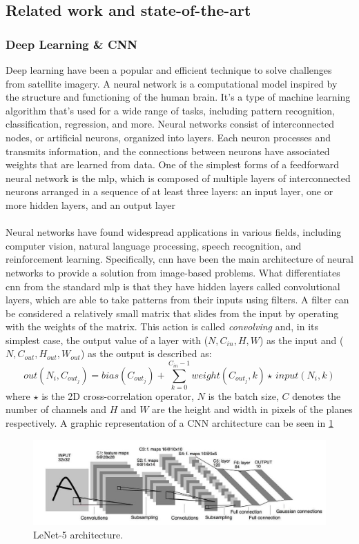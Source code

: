 \documentclass[../main.tex]{subfiles}
\begin{document}
\subsection{Related work and state-of-the-art}\label{sec:soa}
\subsubsection{Deep Learning \& CNN}
Deep learning have been a popular and efficient technique to solve challenges from satellite imagery. A neural network is a computational model inspired by the structure and functioning of the human brain. It's a type of machine learning algorithm that's used for a wide range of tasks, including pattern recognition, classification, regression, and more. Neural networks consist of interconnected nodes, or artificial neurons, organized into layers. Each neuron processes and transmits information, and the connections between neurons have associated weights that are learned from data. One of the simplest forms of a feedforward neural network is the \gls{mlp}, which is composed of multiple layers of interconnected neurons  arranged in a sequence of at least three layers: an input layer, one or more hidden layers, and an output layer
\\
\\
Neural networks have found widespread applications in various fields, including computer vision, natural language processing, speech recognition, and reinforcement learning.
Specifically, \gls{cnn} have been the main architecture of neural networks to provide a solution from image-based problems. What differentiates \gls{cnn} from the standard \gls{mlp} is that they have hidden layers called convolutional layers, which are able to take patterns from their inputs using filters. A filter can be considered a relatively small matrix that slides from the input by operating with the weights of the matrix. This action is called \textit{convolving }and, in its simplest case, the output value of a layer with ($N, C_{in}, H, W$) as the input and ($N, C_{out}, H_{out}, W_{out}$) as the output is described as:
\[out(N_i, C_{out_j}) = bias(C_{out_j}) + \sum_{k=0}^{C_{in} - 1} weight(C_{out_j}, k) \star \, input(N_i, k)\]
where $\star$ is the 2D cross-correlation operator, $N$ is the batch size, $C$ denotes the number of channels and $H$ and $W$ are the height and width in pixels of the planes respectively. A graphic representation of a CNN architecture can be seen in \ref{fig:related-lenet}
\begin{figure}[H]
	\centering
	\includegraphics[width=14cm]{imgs/relatedwork/lenet-5.jpeg}
	\caption{LeNet-5 architecture.}
	\label{fig:related-lenet}
\end{figure}
\end{document}
